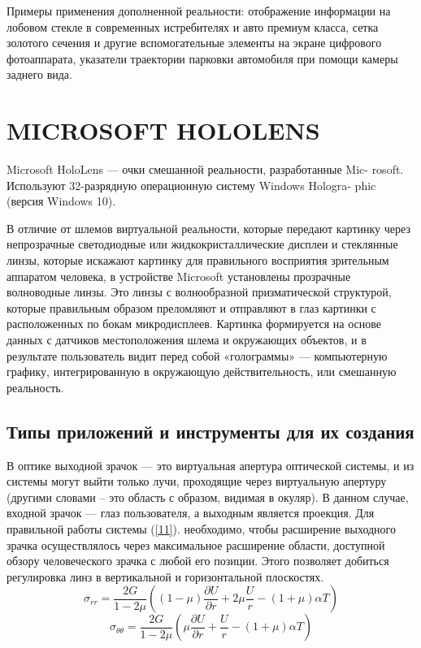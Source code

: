 \documentclass[a4paper, 14pt]{extreport} %
\begin{document}
Примеры применения дополненной реальности: отображение информации на лобовом стекле в современных истребителях и авто премиум класса, сетка золотого сечения и другие вспомогательные элементы на экране цифрового фотоаппарата, указатели траектории парковки автомобиля при помощи камеры заднего вида.

\newpage

\chapter{MICROSOFT HOLOLENS}
Microsoft HoloLens — очки смешанной реальности, разработанные Mic- rosoft. Используют 32-разрядную операционную систему Windows Hologra- phic (версия Windows 10).

В отличие от шлемов виртуальной реальности, которые передают картинку через непрозрачные светодиодные или жидкокристаллические дисплеи и стеклянные линзы, которые искажают картинку для правильного восприятия зрительным аппаратом человека, в устройстве Microsoft установлены прозрачные волноводные линзы. Это линзы с волнообразной призматической структурой, которые правильным образом преломляют и отправляют в глаз картинки с расположенных по бокам \cite{b1} микродисплеев. Картинка формируется на основе данных с датчиков местоположения шлема и окружающих объектов, и в результате пользователь видит перед собой «голограммы» — компьютерную графику, интегрированную в окружающую действительность, или смешанную реальность.

\vspace{0.5cm}

\section{Типы приложений и инструменты для их создания}
В оптике выходной зрачок — это виртуальная апертура оптической системы, и из системы могут выйти только лучи, проходящие через виртуальную апертуру (другими словами – это область с образом, видимая в окуляр). В данном случае, входной зрачок — глаз пользователя, а выходным является проекция. Для правильной работы системы (\ref{11}). необходимо, чтобы расширение выходного зрачка осуществлялось через максимальное расширение области, доступной обзору человеческого зрачка с любой его позиции. Этого позволяет добиться регулировка линз в вертикальной и горизонтальной плоскостях. 
\vspace{0.4cm}
\begin{equation}
\label{11}
\sigma_{rr}=\frac{2G}{1-2\mu}\left((1-\mu)\frac{\partial{U}}{\partial{r}}+2\mu\frac{U}{r}-(1+\mu)\alpha{T}\right)
\end{equation}
\begin{equation}
\label{12}
\sigma_{\theta\theta}=\frac{2G}{1-2\mu}\left(\mu\frac{\partial{U}}{\partial{r}}+\frac{U}{r}-(1+\mu)\alpha{T}\right)
\end{equation}
\vspace{0.4cm}
\end{document}
